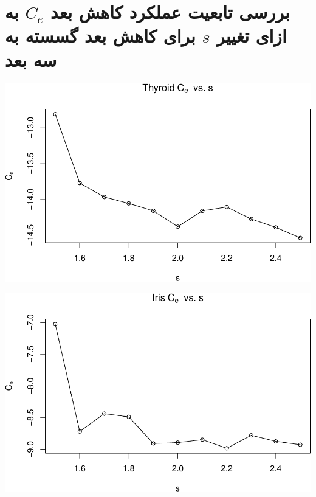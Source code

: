 \section{
بررسی تابعیت عملکرد کاهش بعد $C_e$ به ازای تغییر $s$ برای کاهش بعد گسسته به سه بعد
}


\begin{center}\includegraphics[width=1\linewidth]{Report_files/figure-latex/unnamed-chunk-26-1} \end{center}

\begin{center}\includegraphics[width=1\linewidth]{Report_files/figure-latex/unnamed-chunk-26-2} \end{center}

